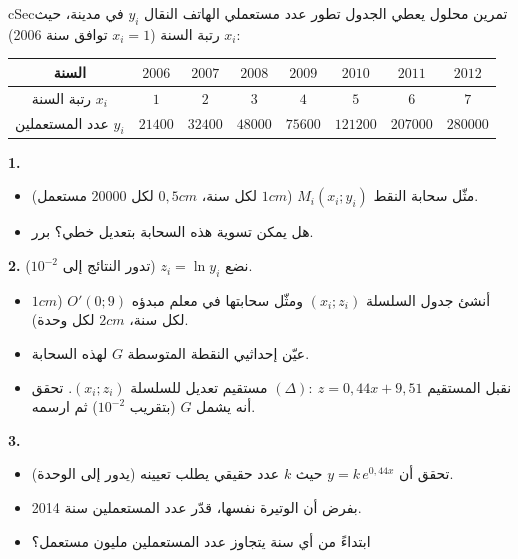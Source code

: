 \documentclass[12pt,a4paper]{article}
\newenvironment{BOX}[2]{\begin{otherlanguage}{english}\begin{arbox}{#1}{#2}}{\end{arbox}\end{otherlanguage}}
\newcounter{exo}
\newenvironment{sq}{\begin{itemize}[leftmargin=2.4em,itemsep=3pt]}{\end{itemize}}
\newcommand{\qa}{\item[(أ)]}\newcommand{\qb}{\item[(ب)]}\newcommand{\qc}{\item[(جـ)]}\newcommand{\qd}{\item[(د)]}\newcommand{\qe}{\item[(هـ)]}
\newcommand{\QQ}[1]{\par\smallskip\textbf{#1.} }
\newenvironment{tmr}{\stepcounter{exo}\begin{BOX}{cSec}{تمرين محلول \theexo}}{\end{BOX}}
\begin{document}
\begin{tmr}
يعطي الجدول تطور عدد مستعملي الهاتف النقال $y_i$ في مدينة، حيث $x_i$ رتبة السنة ($x_i=1$ توافق سنة 2006):
\begin{center}
\setlength{\tabcolsep}{4pt}
\begin{tabular}{|C|c|c|c|c|c|c|c|}\hline
{} السنة & $2006$ & $2007$ & $2008$ & $2009$ & $2010$ & $2011$ & $2012$\\\hline
رتبة السنة $x_i$ & $1$ & $2$ & $3$ & $4$ & $5$ & $6$ & $7$\\\hline
عدد المستعملين $y_i$ & $21400$ & $32400$ & $48000$ & $75600$ & $121200$ & $207000$ & $280000$\\\hline
\end{tabular}
\end{center}
\QQ{1}
\begin{sq}
\qa مثّل سحابة النقط $M_i(x_i;y_i)$ ($1cm$ لكل سنة، $0,5cm$ لكل $20000$ مستعمل).
\qb هل يمكن تسوية هذه السحابة بتعديل خطي؟ برر.
\end{sq}
\QQ{2} نضع $z_i=\ln y_i$ (تدور النتائج إلى $10^{-2}$).
\begin{sq}
\qa أنشئ جدول السلسلة $(x_i;z_i)$ ومثّل سحابتها في معلم مبدؤه $O'(0;9)$ ($1cm$ لكل سنة، $2cm$ لكل وحدة).
\qb عيّن إحداثيي النقطة المتوسطة $G$ لهذه السحابة.
\qc نقبل المستقيم $(\Delta):\ z=0,44x+9,51$ مستقيم تعديل للسلسلة $(x_i;z_i)$. تحقق أنه يشمل $G$ (بتقريب $10^{-2}$) ثم ارسمه.
\end{sq}
\QQ{3}
\begin{sq}
\qa تحقق أن $y=k\,e^{0,44x}$ حيث $k$ عدد حقيقي يطلب تعيينه (يدور إلى الوحدة).
\qb بفرض أن الوتيرة نفسها، قدّر عدد المستعملين سنة 2014.
\qc ابتداءً من أي سنة يتجاوز عدد المستعملين مليون مستعمل؟
\end{sq}
\end{tmr}
\end{document}
